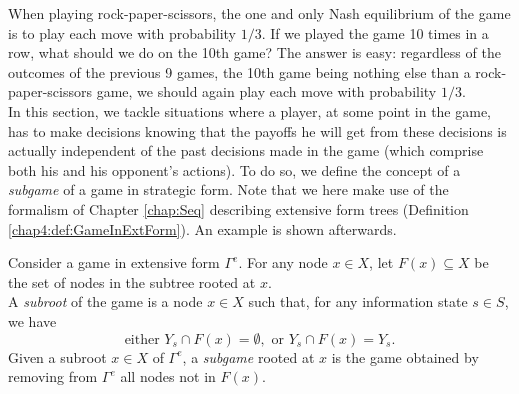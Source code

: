 When playing rock-paper-scissors, the one and only Nash equilibrium of the game is to play each move with probability $1/3$. If we played the game 10 times in a row, what should we do on the 10th game?
The answer is easy: regardless of the outcomes of the previous 9 games, the 10th game being nothing else than a rock-paper-scissors game, we should again play each move with probability $1/3$.\\
In this section, we tackle situations where a player, at some point in the game, has to make decisions knowing that the payoffs he will get from these decisions is actually independent of the past decisions made in the game (which comprise both his and his opponent's actions). 
To do so, we define the concept of a \emph{subgame} of a game in strategic form. Note that we here make use of the formalism of Chapter \ref{chap:Seq} describing extensive form trees (Definition \ref{chap4:def:GameInExtForm}). An example is shown afterwards.
\begin{definition}
Consider a game in extensive form $\Gamma^e$.
For any node $x \in X$, let $F(x) \subseteq X$ be the set of nodes in the subtree rooted at $x$. \\
A \emph{subroot} of the game is a node $x \in X$ such that, for any information state $s \in S$, we have 
$$\text{either } Y_s \cap F(x) = \emptyset, \text{ or } Y_s \cap F(x) = Y_s.$$
Given a subroot $x \in X$ of $\Gamma^e$, a \emph{subgame} rooted at $x$ is the game obtained by removing from $\Gamma^e$ all nodes not in $F(x)$.
\end{definition}

